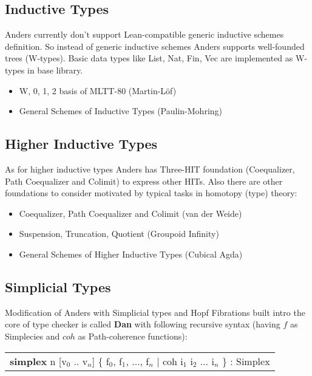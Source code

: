 \documentclass{article}
\theoremstyle{definition}
\newcommand{\tabstyle}[0]{\scriptsize\ttfamily\fontseries{l}\selectfont}
\begin{document}
\newpage
\subsection{Inductive Types}

Anders currently don’t support Lean-compatible generic inductive schemes
definition. So instead of generic inductive schemes Anders supports well-founded trees (W-types).
Basic data types like List, Nat, Fin, Vec are implemented as W-types in base library.

\begin{itemize}
\item W, 0, 1, 2 basis of MLTT-80 (Martin-L\"{o}f)
\item General Schemes of Inductive Types (Paulin-Mohring)
\end{itemize}

\subsection{Higher Inductive Types}

As for higher inductive types Anders has Three-HIT foundation (Coequalizer, Path Coequalizer and Colimit)
to express other HITs. Also there are other foundations to consider motivated by typical tasks in homotopy (type) theory:

\begin{itemize}
\item Coequalizer, Path Coequalizer and Colimit (van der Weide)
\item Suspension, Truncation, Quotient (Groupoid Infinity)
\item General Schemes of Higher Inductive Types (Cubical Agda)
\end{itemize}

\subsection{Simplicial Types}

Modification of Anders with Simplicial types and Hopf Fibrations built intro the core of type checker
is called \textbf{Dan} with following recursive syntax (having $f$ as Simplecies and $coh$ as Path-coherence functions):

\begin{table}[ht!]
\tabstyle
\begin{tabular}{l}
   \textbf{simplex} n [v$_0$ .. v$_n$] \{ f$_0$, f$_1$, ..., f$_n$ | coh i$_1$ i$_2$ ... i$_n$ \} : Simplex
\end{tabular}
\end{table}
\end{document}
